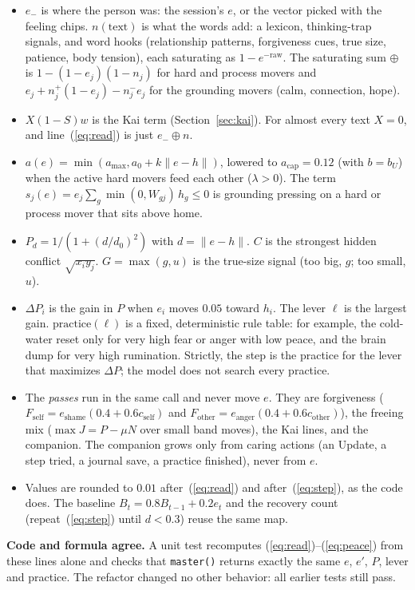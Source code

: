 \documentclass[10pt]{article}
\theoremstyle{remark}
\newcommand{\norm}[1]{\lVert #1\rVert}
\begin{document}
\begin{itemize}
\item $e_{-}$ is where the person was: the session's $e$, or the vector picked with the feeling chips. $n(\text{text})$ is what the words add: a lexicon, thinking-trap signals, and word hooks (relationship patterns, forgiveness cues, true size, patience, body tension), each saturating as $1-e^{-\text{raw}}$. The saturating sum $\oplus$ is $1-(1-e_j)(1-n_j)$ for hard and process movers and $e_j+n_j^{+}(1-e_j)-n_j^{-}e_j$ for the grounding movers (calm, connection, hope).
\item $X(1-S)w$ is the Kai term (Section~\ref{sec:kai}). For almost every text $X=0$, and line~(\ref{eq:read}) is just $e_{-}\oplus n$.
\item $a(e)=\min(a_{\max}, a_0+k\norm{e-h})$, lowered to $a_{\mathrm{cap}}=0.12$ (with $b=b_U$) when the active hard movers feed each other ($\lambda>0$). The term $s_j(e)=e_j\sum_{g}\min(0,W_{gj})\,h_g\le 0$ is grounding pressing on a hard or process mover that sits above home.
\item $P_d=1/(1+(d/d_0)^2)$ with $d=\norm{e-h}$. $C$ is the strongest hidden conflict $\sqrt{x_iy_j}$. $G=\max(g,u)$ is the true-size signal (too big, $g$; too small, $u$).
\item $\Delta P_i$ is the gain in $P$ when $e_i$ moves $0.05$ toward $h_i$. The lever $\ell$ is the largest gain. $\text{practice}(\ell)$ is a fixed, deterministic rule table: for example, the cold-water reset only for very high fear or anger with low peace, and the brain dump for very high rumination. Strictly, the step is the practice for the lever that maximizes $\Delta P$; the model does not search every practice.
\item The \emph{passes} run in the same call and never move $e$. They are forgiveness ($F_{\text{self}}=e_{\text{shame}}(0.4+0.6c_{\text{self}})$ and $F_{\text{other}}=e_{\text{anger}}(0.4+0.6c_{\text{other}})$), the freeing mix ($\max J=P-\mu N$ over small band moves), the Kai lines, and the companion. The companion grows only from caring actions (an Update, a step tried, a journal save, a practice finished), never from $e$.
\item Values are rounded to $0.01$ after~(\ref{eq:read}) and after~(\ref{eq:step}), as the code does. The baseline $B_t=0.8B_{t-1}+0.2e_t$ and the recovery count (repeat~(\ref{eq:step}) until $d<0.3$) reuse the same map.
\end{itemize}
\textbf{Code and formula agree.} A unit test recomputes (\ref{eq:read})--(\ref{eq:peace}) from these lines alone and checks that \texttt{master()} returns exactly the same $e$, $e'$, $P$, lever and practice. The refactor changed no other behavior: all earlier tests still pass.
\end{document}

